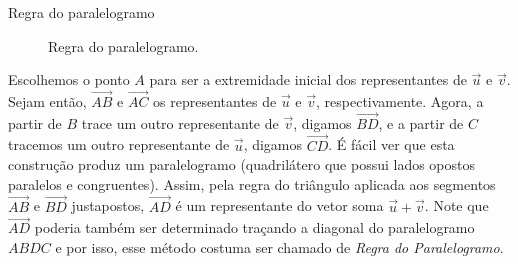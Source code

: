 \begin{observationtitle}{Regra do paralelogramo}
\begin{figure}[H]
 \caption{Regra do paralelogramo.} \label{fig-geometria-operacoesvetores-10} 
 \end{figure}
Escolhemos o ponto \(A\) para ser a extremidade inicial dos representantes de \(\vec{u}\) e \(\vec{v}\). Sejam então, \(\overrightarrow{AB}\) e \(\overrightarrow{AC}\) os representantes de \(\vec{u}\) e \(\vec{v}\), respectivamente. Agora, a partir de \(B\) trace um outro representante de \(\vec{v}\), digamos \(\overrightarrow{BD}\), e a partir de \(C\) tracemos um outro representante de \(\vec{u}\), digamos \(\overrightarrow{CD}\). É fácil ver que esta construção produz um paralelogramo (quadrilátero que possui lados opostos paralelos e congruentes). Assim, pela regra do triângulo aplicada aos segmentos \(\overrightarrow{AB}\) e \(\overrightarrow{BD}\) justapostos, \(\overrightarrow{AD}\) é um representante do vetor soma \(\vec{u}+\vec{v}\). Note que \(\overrightarrow{AD}\) poderia também ser determinado traçando a diagonal do paralelogramo \(ABDC\) e por isso, esse método costuma ser chamado de \textit{Regra do Paralelogramo}.
\end{observationtitle}

